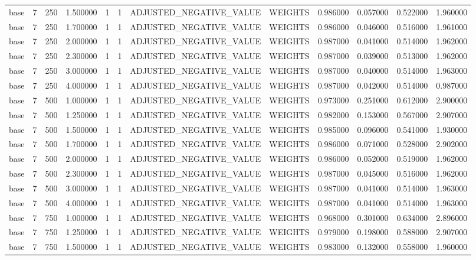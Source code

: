 \begin{tabular}{lrrrllllrrrr}
base & 7 & 250 & 1.500000 & 1 & 1 & ADJUSTED_NEGATIVE_VALUE & WEIGHTS & 0.986000 & 0.057000 & 0.522000 & 1.960000 \\
base & 7 & 250 & 1.700000 & 1 & 1 & ADJUSTED_NEGATIVE_VALUE & WEIGHTS & 0.986000 & 0.046000 & 0.516000 & 1.961000 \\
base & 7 & 250 & 2.000000 & 1 & 1 & ADJUSTED_NEGATIVE_VALUE & WEIGHTS & 0.987000 & 0.041000 & 0.514000 & 1.962000 \\
base & 7 & 250 & 2.300000 & 1 & 1 & ADJUSTED_NEGATIVE_VALUE & WEIGHTS & 0.987000 & 0.039000 & 0.513000 & 1.962000 \\
base & 7 & 250 & 3.000000 & 1 & 1 & ADJUSTED_NEGATIVE_VALUE & WEIGHTS & 0.987000 & 0.040000 & 0.514000 & 1.963000 \\
base & 7 & 250 & 4.000000 & 1 & 1 & ADJUSTED_NEGATIVE_VALUE & WEIGHTS & 0.987000 & 0.042000 & 0.514000 & 0.987000 \\
base & 7 & 500 & 1.000000 & 1 & 1 & ADJUSTED_NEGATIVE_VALUE & WEIGHTS & 0.973000 & 0.251000 & 0.612000 & 2.900000 \\
base & 7 & 500 & 1.250000 & 1 & 1 & ADJUSTED_NEGATIVE_VALUE & WEIGHTS & 0.982000 & 0.153000 & 0.567000 & 2.907000 \\
base & 7 & 500 & 1.500000 & 1 & 1 & ADJUSTED_NEGATIVE_VALUE & WEIGHTS & 0.985000 & 0.096000 & 0.541000 & 1.930000 \\
base & 7 & 500 & 1.700000 & 1 & 1 & ADJUSTED_NEGATIVE_VALUE & WEIGHTS & 0.986000 & 0.071000 & 0.528000 & 2.902000 \\
base & 7 & 500 & 2.000000 & 1 & 1 & ADJUSTED_NEGATIVE_VALUE & WEIGHTS & 0.986000 & 0.052000 & 0.519000 & 1.962000 \\
base & 7 & 500 & 2.300000 & 1 & 1 & ADJUSTED_NEGATIVE_VALUE & WEIGHTS & 0.987000 & 0.045000 & 0.516000 & 1.962000 \\
base & 7 & 500 & 3.000000 & 1 & 1 & ADJUSTED_NEGATIVE_VALUE & WEIGHTS & 0.987000 & 0.041000 & 0.514000 & 1.963000 \\
base & 7 & 500 & 4.000000 & 1 & 1 & ADJUSTED_NEGATIVE_VALUE & WEIGHTS & 0.987000 & 0.041000 & 0.514000 & 1.963000 \\
base & 7 & 750 & 1.000000 & 1 & 1 & ADJUSTED_NEGATIVE_VALUE & WEIGHTS & 0.968000 & 0.301000 & 0.634000 & 2.896000 \\
base & 7 & 750 & 1.250000 & 1 & 1 & ADJUSTED_NEGATIVE_VALUE & WEIGHTS & 0.979000 & 0.198000 & 0.588000 & 2.907000 \\
base & 7 & 750 & 1.500000 & 1 & 1 & ADJUSTED_NEGATIVE_VALUE & WEIGHTS & 0.983000 & 0.132000 & 0.558000 & 1.960000 \\

\end{tabular}
